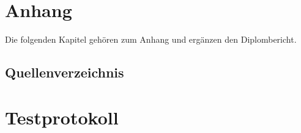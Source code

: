 \section{Anhang}
Die folgenden Kapitel gehören zum Anhang und ergänzen den Diplombericht.


\clearpage
\renewcommand{\refname}{Literaturverzeichnis}
\subsection{Quellenverzeichnis}

\newpage


\section{Testprotokoll}





 
 